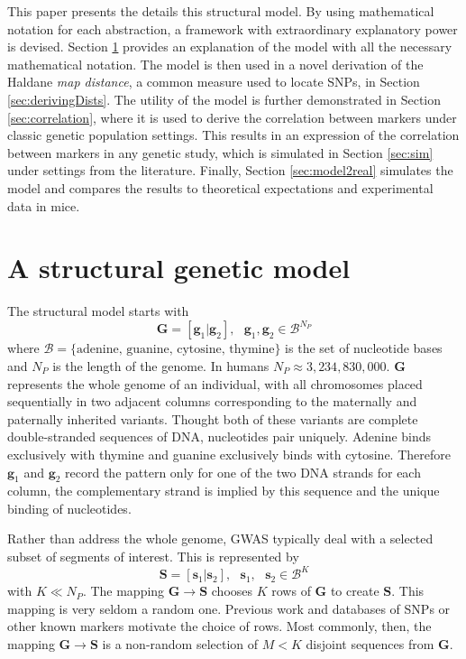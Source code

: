\documentclass[sts]{imsart}
\newcommand{\ve}[1]{\mathbf{#1}}           %
\newcommand{\m}[1]{\mathbf{#1}}               %
\begin{document}
This paper presents the details this structural model. By using mathematical notation for each abstraction, a framework with extraordinary explanatory power is devised. Section \ref{sec:theModel} provides an explanation of the model with all the necessary mathematical notation. The model is then used in a novel derivation of the Haldane \emph{map distance}, a common measure used to locate SNPs, in Section \ref{sec:derivingDists}. The utility of the model is further demonstrated in Section \ref{sec:correlation}, where it is used to derive the correlation between markers under classic genetic population settings. This results in an expression of the correlation between markers in any genetic study, which is simulated in Section \ref{sec:sim} under settings from the literature. Finally, Section \ref{sec:model2real} simulates the model and compares the results to theoretical expectations and experimental data in mice.

\section{A structural genetic model} \label{sec:theModel}

The structural model starts with
$$\m{G} = [\ve{g}_1| \ve{g}_2], \text{ } \ve{g}_1, \ve{g}_2 \in \mathcal{B}^{N_P}$$
where $\mathcal{B} = \{\text{adenine, guanine, cytosine, thymine}\}$ is the set of nucleotide bases and $N_P$ is the length of the genome. In humans $N_P \approx 3,234,830,000$. $\m{G}$ represents the whole genome of an individual, with all chromosomes placed sequentially in two adjacent columns corresponding to the maternally and paternally inherited variants. Thought both of these variants are complete double-stranded sequences of DNA, nucleotides pair uniquely. Adenine binds exclusively with thymine and guanine exclusively binds with cytosine. Therefore $\ve{g}_1$ and $\ve{g}_2$ record the pattern only for one of the two DNA strands for each column, the complementary strand is implied by this sequence and the unique binding of nucleotides.

Rather than address the whole genome, GWAS typically deal with a selected subset of segments of interest. This is represented by
$$\m{S} = [\ve{s}_1 | \ve{s}_2], \text{ } \ve{s}_1, \text{ } \ve{s}_2 \in \mathcal{B}^K$$
with $K \ll N_P$. The mapping $\m{G} \rightarrow \m{S}$ chooses $K$ rows of $\m{G}$ to create $\m{S}$. This mapping is very seldom a random one. Previous work and databases of SNPs or other known markers motivate the choice of rows. Most commonly, then, the mapping $\m{G} \rightarrow \m{S}$ is a non-random selection of $M < K$ disjoint sequences from $\m{G}$.
\end{document}
